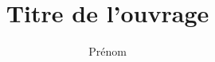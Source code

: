 \documentclass[french,fleqn,allpages]{ISTE_Science}
\title{Titre de l'ouvrage}
\author{Prénom \Name{Nom} \\}
\let\oldlistofalgorithms\listofalgorithms
\let\oldnumberline\numberline%
\newcommand{\algnumberline}[1]{#1~}
\renewcommand{\listofalgorithms}{%
  \let\numberline\algnumberline%
  \oldlistofalgorithms
  \let\numberline\oldnumberline%
}
\let\oldinput
\begin{document}
\fontsize{10}{12.5}\selectfont

\maketitle
%
\mainmatter


\cleardoublepage



%






\chapter*{Conclusion}



\printindex
\end{document}
